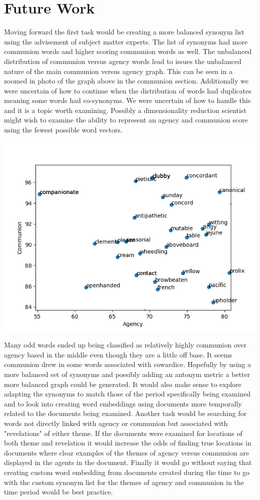 \documentclass{article}
\begin{document}
\section*{Future Work}
Moving forward the first task would be creating a more balanced synonym list using the advisement of subject matter experts. The list of synonyms had more communion words and higher scoring communion words as well. The unbalanced distribution of communion versus agency words lead to issues the unbalanced nature of the main communion versus agency graph.   This can be seen in a zoomed in photo of the graph above in the communion section. Additionally we were uncertain of how to continue when the distribution of words had duplicates meaning some words had co-synonyms. We were uncertain of how to handle this and it is a topic worth examining. Possibly a dimensionality reduction scientist might wish to examine the ability to represent an agency and communion score using the fewest possible word vectors.  \\
\begin{center}
\includegraphics[width=0.8\linewidth]{communion_agency.png}\\
\end{center}
Many odd words ended up being classified as relatively highly communion over agency based in the middle even though they are a little off base. It seems communion drew in some words associated with cowardice. Hopefully by using a more balanced set of synonyms and possibly adding an antonym metric a better more balanced graph could be generated. It would also make sense to explore adapting the synonyms to match those of the period specifically being examined and to look into creating word embeddings using documents more temporally related to the documents being examined. Another task would be searching for words not directly linked with agency or communion but associated with "revelations" of either theme. If the documents were examined for locations of both theme and revelation it would increase the odds of finding true locations in documents where clear examples of the themes of agency versus communion are displayed in the agents in the document. Finally it would go without saying that creating custom word embedding from documents created during the time to go with the custom synonym list for the themes of agency and communion in the time period would be best practice.
\end{document}
